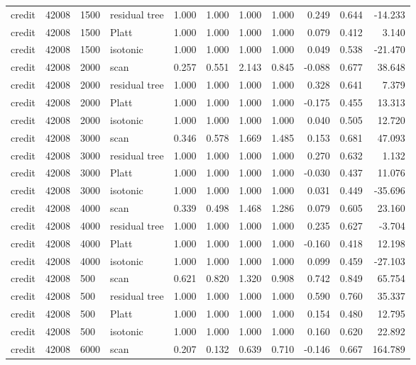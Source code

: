 \begin{tabular}{lrllrrrrrrr}
credit & 42008 & 1500 & residual tree & 1.000 & 1.000 & 1.000 & 1.000 & 0.249 & 0.644 & -14.233 \\
credit & 42008 & 1500 & Platt & 1.000 & 1.000 & 1.000 & 1.000 & 0.079 & 0.412 & 3.140 \\
credit & 42008 & 1500 & isotonic & 1.000 & 1.000 & 1.000 & 1.000 & 0.049 & 0.538 & -21.470 \\
credit & 42008 & 2000 & scan & 0.257 & 0.551 & 2.143 & 0.845 & -0.088 & 0.677 & 38.648 \\
credit & 42008 & 2000 & residual tree & 1.000 & 1.000 & 1.000 & 1.000 & 0.328 & 0.641 & 7.379 \\
credit & 42008 & 2000 & Platt & 1.000 & 1.000 & 1.000 & 1.000 & -0.175 & 0.455 & 13.313 \\
credit & 42008 & 2000 & isotonic & 1.000 & 1.000 & 1.000 & 1.000 & 0.040 & 0.505 & 12.720 \\
credit & 42008 & 3000 & scan & 0.346 & 0.578 & 1.669 & 1.485 & 0.153 & 0.681 & 47.093 \\
credit & 42008 & 3000 & residual tree & 1.000 & 1.000 & 1.000 & 1.000 & 0.270 & 0.632 & 1.132 \\
credit & 42008 & 3000 & Platt & 1.000 & 1.000 & 1.000 & 1.000 & -0.030 & 0.437 & 11.076 \\
credit & 42008 & 3000 & isotonic & 1.000 & 1.000 & 1.000 & 1.000 & 0.031 & 0.449 & -35.696 \\
credit & 42008 & 4000 & scan & 0.339 & 0.498 & 1.468 & 1.286 & 0.079 & 0.605 & 23.160 \\
credit & 42008 & 4000 & residual tree & 1.000 & 1.000 & 1.000 & 1.000 & 0.235 & 0.627 & -3.704 \\
credit & 42008 & 4000 & Platt & 1.000 & 1.000 & 1.000 & 1.000 & -0.160 & 0.418 & 12.198 \\
credit & 42008 & 4000 & isotonic & 1.000 & 1.000 & 1.000 & 1.000 & 0.099 & 0.459 & -27.103 \\
credit & 42008 & 500 & scan & 0.621 & 0.820 & 1.320 & 0.908 & 0.742 & 0.849 & 65.754 \\
credit & 42008 & 500 & residual tree & 1.000 & 1.000 & 1.000 & 1.000 & 0.590 & 0.760 & 35.337 \\
credit & 42008 & 500 & Platt & 1.000 & 1.000 & 1.000 & 1.000 & 0.154 & 0.480 & 12.795 \\
credit & 42008 & 500 & isotonic & 1.000 & 1.000 & 1.000 & 1.000 & 0.160 & 0.620 & 22.892 \\
credit & 42008 & 6000 & scan & 0.207 & 0.132 & 0.639 & 0.710 & -0.146 & 0.667 & 164.789 \\

\end{tabular}
